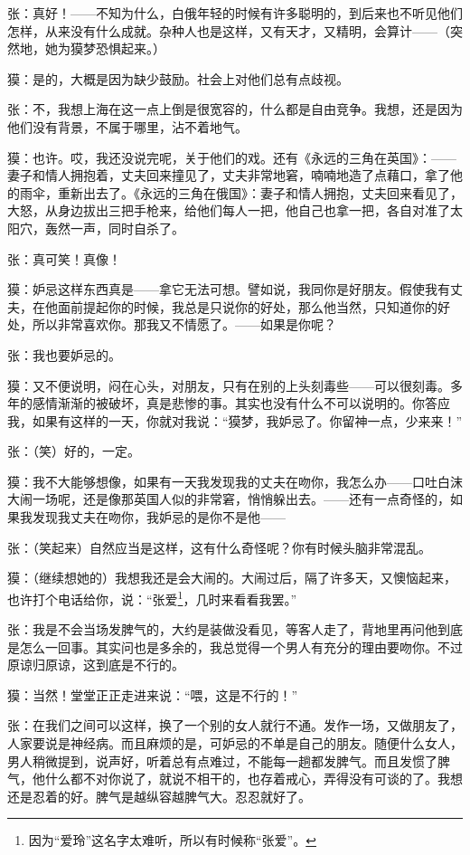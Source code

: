 \par 张：真好！——不知为什么，白俄年轻的时候有许多聪明的，到后来也不听见他们怎样，从来没有什么成就。杂种人也是这样，又有天才，又精明，会算计——（突然地，她为獏梦恐惧起来。）
\par 獏：是的，大概是因为缺少鼓励。社会上对他们总有点歧视。
\par 张：不，我想上海在这一点上倒是很宽容的，什么都是自由竞争。我想，还是因为他们没有背景，不属于哪里，沾不着地气。
\par 獏：也许。哎，我还没说完呢，关于他们的戏。还有《永远的三角在英国》：——妻子和情人拥抱着，丈夫回来撞见了，丈夫非常地窘，喃喃地造了点藉口，拿了他的雨伞，重新出去了。《永远的三角在俄国》：妻子和情人拥抱，丈夫回来看见了，大怒，从身边拔出三把手枪来，给他们每人一把，他自己也拿一把，各自对准了太阳穴，轰然一声，同时自杀了。
\par 张：真可笑！真像！
\par 獏：妒忌这样东西真是——拿它无法可想。譬如说，我同你是好朋友。假使我有丈夫，在他面前提起你的时候，我总是只说你的好处，那么他当然，只知道你的好处，所以非常喜欢你。那我又不情愿了。——如果是你呢？
\par 张：我也要妒忌的。
\par 獏：又不便说明，闷在心头，对朋友，只有在别的上头刻毒些——可以很刻毒。多年的感情渐渐的被破坏，真是悲惨的事。其实也没有什么不可以说明的。你答应我，如果有这样的一天，你就对我说：“獏梦，我妒忌了。你留神一点，少来来！”
\par 张：（笑）好的，一定。
\par 獏：我不大能够想像，如果有一天我发现我的丈夫在吻你，我怎么办——口吐白沫大闹一场呢，还是像那英国人似的非常窘，悄悄躲出去。——还有一点奇怪的，如果我发现我丈夫在吻你，我妒忌的是你不是他——
\par 张：（笑起来）自然应当是这样，这有什么奇怪呢？你有时候头脑非常混乱。
\par 獏：（继续想她的）我想我还是会大闹的。大闹过后，隔了许多天，又懊恼起来，也许打个电话给你，说：“张爱\footnote{因为“爱玲”这名字太难听，所以有时候称“张爱”。}，几时来看看我罢。”
\par 张：我是不会当场发脾气的，大约是装做没看见，等客人走了，背地里再问他到底是怎么一回事。其实问也是多余的，我总觉得一个男人有充分的理由要吻你。不过原谅归原谅，这到底是不行的。
\par 獏：当然！堂堂正正走进来说：“喂，这是不行的！”
\par 张：在我们之间可以这样，换了一个别的女人就行不通。发作一场，又做朋友了，人家要说是神经病。而且麻烦的是，可妒忌的不单是自己的朋友。随便什么女人，男人稍微提到，说声好，听着总有点难过，不能每一趟都发脾气。而且发惯了脾气，他什么都不对你说了，就说不相干的，也存着戒心，弄得没有可谈的了。我想还是忍着的好。脾气是越纵容越脾气大。忍忍就好了。
